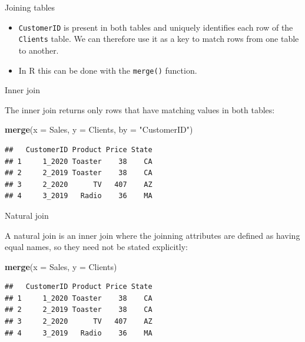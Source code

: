 \documentclass[ignorenonframetext,]{beamer}
\newenvironment{Shaded}{\begin{snugshade}}{\end{snugshade}}
\newcommand{\DataTypeTok}[1]{\textcolor[rgb]{0.13,0.29,0.53}{#1}}
\newcommand{\KeywordTok}[1]{\textcolor[rgb]{0.13,0.29,0.53}{\textbf{#1}}}
\newcommand{\NormalTok}[1]{#1}
\newcommand{\StringTok}[1]{\textcolor[rgb]{0.31,0.60,0.02}{#1}}
\begin{document}
\begin{frame}[fragile]{Joining tables}
\protect\hypertarget{joining-tables}{}

\begin{itemize}
\item
  \texttt{CustomerID} is present in both tables and uniquely identifies
  each row of the \texttt{Clients} table. We can therefore use it as a
  key to match rows from one table to another.
\item
  In R this can be done with the \texttt{merge()} function.
\end{itemize}

\end{frame}

\begin{frame}[fragile]{Inner join}
\protect\hypertarget{inner-join}{}

The inner join returns only rows that have matching values in both
tables:

\begin{Shaded}
\begin{Highlighting}[]
\KeywordTok{merge}\NormalTok{(}\DataTypeTok{x =}\NormalTok{ Sales, }\DataTypeTok{y =}\NormalTok{ Clients,}
  \DataTypeTok{by =} \StringTok{"CustomerID"}\NormalTok{) }
\end{Highlighting}
\end{Shaded}

\begin{verbatim}
##   CustomerID Product Price State
## 1     1_2020 Toaster    38    CA
## 2     2_2019 Toaster    38    CA
## 3     2_2020      TV   407    AZ
## 4     3_2019   Radio    36    MA
\end{verbatim}

\end{frame}

\begin{frame}[fragile]{Natural join}
\protect\hypertarget{natural-join}{}

A natural join is an inner join where the joinning attributes are
defined as having equal names, so they need not be stated explicitly:

\begin{Shaded}
\begin{Highlighting}[]
\KeywordTok{merge}\NormalTok{(}\DataTypeTok{x =}\NormalTok{ Sales, }\DataTypeTok{y =}\NormalTok{ Clients) }
\end{Highlighting}
\end{Shaded}

\begin{verbatim}
##   CustomerID Product Price State
## 1     1_2020 Toaster    38    CA
## 2     2_2019 Toaster    38    CA
## 3     2_2020      TV   407    AZ
## 4     3_2019   Radio    36    MA
\end{verbatim}

\end{frame}
\end{document}
